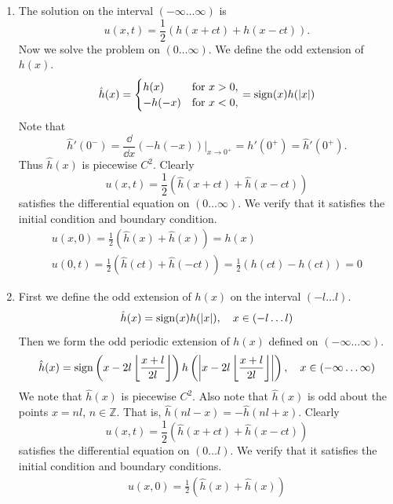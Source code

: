 {%
\begin{Solution}
  \begin{enumerate}
  \item
    The solution on the interval $(-\infty \ldots \infty)$ is
    \[
    u(x,t) = \frac{1}{2} (h(x + c t) + h(x - c t)).
    \]
    Now we solve the problem on $(0 \ldots \infty)$.  We define the odd
    extension of $h(x)$.
    \[
    \hat{h}(x) = 
    \begin{cases}
      h(x)    &\mathrm{for}\ x > 0, \\
      -h(-x)  &\mathrm{for}\ x < 0,
    \end{cases}
    = \mathop{\mathrm{sign}}\nolimits(x) h(|x|)
    \]
    Note that 
    \[
    \hat{h}'(0^-) = \frac{\dd}{\dd x}(-h(-x)) \big|_{x \to 0^+} = h'(0^+) 
    = \hat{h}'(0^+).
    \]
    Thus $\hat{h}(x)$ is piecewise $C^2$.  Clearly
    \[
    u(x,t) = \frac{1}{2} (\hat{h}(x + c t) + \hat{h}(x - c t))
    \]
    satisfies the differential equation on $(0 \ldots \infty)$. We
    verify that it satisfies the initial condition and boundary condition.
    \begin{gather*}
      u(x,0) = \frac{1}{2} (\hat{h}(x) + \hat{h}(x)) = h(x) \\
      u(0,t) = \frac{1}{2} (\hat{h}(c t) + \hat{h}(- c t))
      = \frac{1}{2} (h(c t) - h(c t))
      = 0
    \end{gather*}
  \item
    First we define the odd extension of $h(x)$ on the interval 
    $(-l \ldots l)$.
    \[
    \hat{h}(x) = \mathop{\mathrm{sign}}\nolimits(x) h(|x|), \quad x \in (-l \ldots l)
    \]
    Then we form the odd periodic extension of $h(x)$ defined on
    $(-\infty \ldots \infty)$.
    \[
    \hat{h}(x) = \mathop{\mathrm{sign}}\nolimits \left( x - 2 l \left\lfloor 
        \frac{x+l}{2l} \right\rfloor \right) 
    h\left( \left| x - 2 l \left\lfloor 
          \frac{x+l}{2l} \right\rfloor \right| \right),
    \quad x \in (-\infty \ldots \infty)
    \]
    We note that $\hat{h}(x)$ is piecewise $C^2$.  
    Also note that $\hat{h}(x)$ is odd about the points $x = n l$,
    $n \in \mathbb{Z}$.  That is, $\hat{h}(n l - x) = - \hat{h}(n l + x)$.
    Clearly
    \[
    u(x,t) = \frac{1}{2} (\hat{h}(x + c t) + \hat{h}(x - c t))
    \]
    satisfies the differential equation on $(0 \ldots l)$. We
    verify that it satisfies the initial condition and boundary conditions.
    \begin{gather*}
      u(x,0) = \frac{1}{2} (\hat{h}(x) + \hat{h}(x)) \\

\end{gather*}
\end{enumerate}
\end{Solution}}
